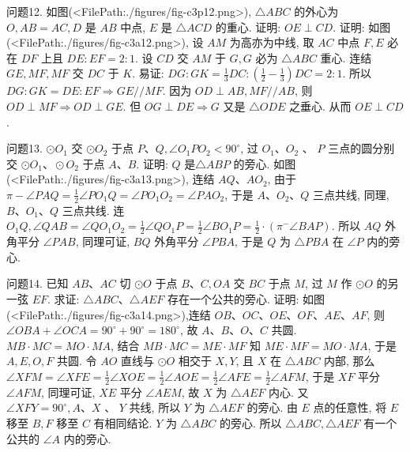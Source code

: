 问题12. 如图(<FilePath:./figures/fig-c3p12.png>), $ \triangle A B C$ 的外心为 $O, A B=A C, D$ 是 $A B$ 中点, $E$ 是 $\triangle A C D$ 的重心.
证明: $O E \perp C D$.
证明: 如图(<FilePath:./figures/fig-c3a12.png>), 设 $A M$ 为高亦为中线, 取 $A C$ 中点 $F, E$ 必在 $D F$ 上且 $D E: E F=2: 1$. 设 $C D$ 交 $A M$ 于 $G, G$ 必为 $\triangle A B C$ 重心.
连结 $G E, M F, M F$ 交 $D C$ 于 $K$.
易证: $D G: G K=\frac{1}{3} D C:\left(\frac{1}{2}-\frac{1}{3}\right) D C=2: 1$.
所以 $D G: G K=D E: E F \Rightarrow G E / / M F$.
因为 $O D \perp A B, M F / / A B$, 则 $O D \perp M F \Rightarrow O D \perp G E$.
但 $O G \perp D E \Rightarrow G$ 又是 $\triangle O D E$ 之垂心.
从而 $O E \perp C D$.



问题13. $ \odot O_1$ 交 $\odot O_2$ 于点 $P 、 Q, \angle O_1 P O_2<90^{\circ}$, 过 $O_1 、 O_2$ 、 $P$ 三点的圆分别交 $\odot O_1 、 \odot O_2$ 于点 $A 、 B$. 证明: $Q$ 是$\triangle A B P$ 的旁心.
如图(<FilePath:./figures/fig-c3a13.png>), 连结 $A Q 、 A O_2$, 由于 $\pi-\angle P A Q=\frac{1}{2} \angle P O_1 Q=\angle P O_1 O_2= \angle P A O_2$, 于是 $A 、 O_2 、 Q$ 三点共线, 同理, $B 、 O_1 、 Q$ 三点共线.
连 $O_1 Q, \angle Q A B= \angle Q O_1 O_2=\frac{1}{2} \angle Q O_1 P=\frac{1}{2} \angle B O_1 P=\frac{1}{2} \cdot\left(\pi^{-} \angle B A P\right)$. 所以 $A Q$ 外角平分 $\angle P A B$, 同理可证, $B Q$ 外角平分 $\angle P B A$, 于是 $Q$ 为 $\triangle P B A$ 在 $\angle P$ 内的旁心.



问题14. 已知 $A B 、 A C$ 切 $\odot O$ 于点 $B 、 C, O A$ 交 $B C$ 于点 $M$, 过 $M$ 作 $\odot O$ 的另一弦 $E F$. 求证: $\triangle A B C 、 \triangle A E F$ 存在一个公共的旁心.
证明: 如图(<FilePath:./figures/fig-c3a14.png>),连结 $O B 、 O C 、 O E 、 O F 、 A E 、 A F$, 则 $\angle O B A+\angle O C A=90^{\circ}+ 90^{\circ}=180^{\circ}$, 故 $A 、 B 、 O 、 C$ 共圆.
$M B \cdot M C=M O \cdot M A$, 结合 $M B \cdot M C= M E \cdot M F$ 知 $M E \cdot M F=M O \cdot M A$, 于是 $A, E, O, F$ 共圆.
令 $A O$ 直线与 $\odot O$ 相交于 $X, Y$, 且 $X$ 在 $\triangle A B C$ 内部, 那么 $\angle X F M=\angle X F E= \frac{1}{2} \angle X O E=\frac{1}{2} \angle A O E=\frac{1}{2} \angle A F E=\frac{1}{2} \angle A F M$, 于是 $X F$ 平分 $\angle A F M$, 同理可证, $X E$ 平分 $\angle A E M$, 故 $X$ 为 $\triangle A E F$ 内心.
又 $\angle X F Y=90^{\circ}, A 、 X$ 、 $Y$ 共线, 所以 $Y$ 为 $\triangle A E F$ 的旁心.
由 $E$ 点的任意性, 将 $E$ 移至 $B, F$ 移至 $C$ 有相同结论.
$Y$ 为 $\triangle A B C$ 的旁心.
所以 $\triangle A B C, \triangle A E F$ 有一个公共的 $\angle A$ 内的旁心.



